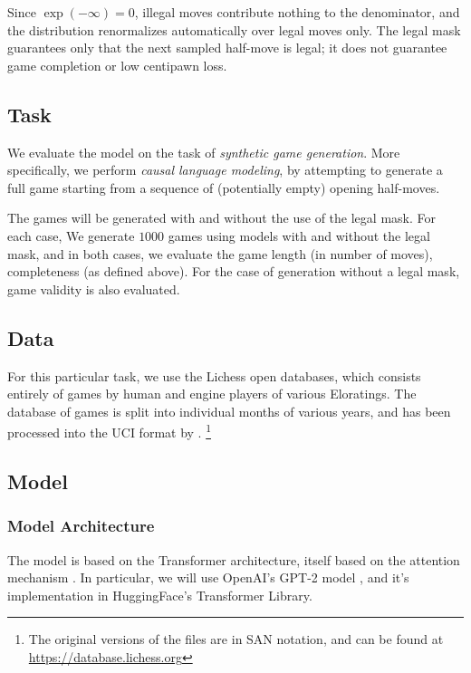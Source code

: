 \documentclass[11pt, a4paper]{article}
\begin{document}
Since \(\exp(-\infty) = 0\), illegal moves contribute nothing to the denominator, and the distribution renormalizes automatically over legal moves only. The legal mask guarantees only that the next sampled half-move is legal; it does not guarantee game completion or low centipawn loss.

\subsection{Task}


We evaluate the model on the task of \textit{synthetic game generation}. More specifically, we perform \textit{causal language modeling}, by attempting to generate a full game starting from a sequence of (potentially empty) opening half-moves.

The games will be generated with and without the use of the legal mask. For each case, We generate \(1000\) games using models with and without the legal mask, and in both cases, we evaluate the game length (in number of moves), completeness (as defined above). For the case of generation without a legal mask, game validity is also evaluated.

\subsection{Data}

For this particular task, we use the Lichess open databases, which consists entirely of games by human and engine players of various Eloratings. The database of games is split into individual months of various years, and has been processed into the UCI format by \citet{davis-2024}. \footnote{The original versions of the files are in SAN notation, and can be found at \url{https://database.lichess.org}}

\subsection{Model}

\subsubsection{Model Architecture}

The model is based on the Transformer architecture, itself based on the attention mechanism \citep{vaswani-2017}. In particular, we will use OpenAI's GPT-2 model \citep{radford-2019}, and it's implementation in HuggingFace's Transformer Library.
\end{document}
